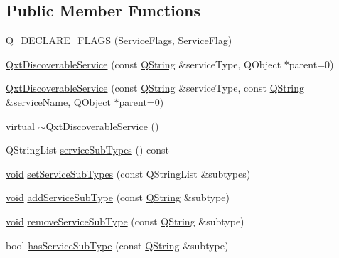 \subsection*{Public Member Functions}
\begin{DoxyCompactItemize}
\item 
\hyperlink{class_qxt_discoverable_service_aa1e5bca57c8a274e6546d1070f218bce}{Q\-\_\-\-D\-E\-C\-L\-A\-R\-E\-\_\-\-F\-L\-A\-G\-S} (Service\-Flags, \hyperlink{class_qxt_discoverable_service_ab0150c1654466841078bf25055120914}{Service\-Flag})
\item 
\hyperlink{class_qxt_discoverable_service_a46bb5631868e0e3bd4b2f62d7be0cb8d}{Qxt\-Discoverable\-Service} (const \hyperlink{group___u_a_v_objects_plugin_gab9d252f49c333c94a72f97ce3105a32d}{Q\-String} \&service\-Type, Q\-Object $\ast$parent=0)
\item 
\hyperlink{class_qxt_discoverable_service_a5ecd5ee4928d8c5530b0b89df9f8ec69}{Qxt\-Discoverable\-Service} (const \hyperlink{group___u_a_v_objects_plugin_gab9d252f49c333c94a72f97ce3105a32d}{Q\-String} \&service\-Type, const \hyperlink{group___u_a_v_objects_plugin_gab9d252f49c333c94a72f97ce3105a32d}{Q\-String} \&service\-Name, Q\-Object $\ast$parent=0)
\item 
virtual \hyperlink{class_qxt_discoverable_service_afefcc1cd57832dfd5291a3dd068250ec}{$\sim$\-Qxt\-Discoverable\-Service} ()
\item 
Q\-String\-List \hyperlink{class_qxt_discoverable_service_a4552a3a6e43a47e503240917f897ba53}{service\-Sub\-Types} () const 
\item 
\hyperlink{group___u_a_v_objects_plugin_ga444cf2ff3f0ecbe028adce838d373f5c}{void} \hyperlink{class_qxt_discoverable_service_a9f34f393ad6d0c27d56cb56e6b3f03d9}{set\-Service\-Sub\-Types} (const Q\-String\-List \&subtypes)
\item 
\hyperlink{group___u_a_v_objects_plugin_ga444cf2ff3f0ecbe028adce838d373f5c}{void} \hyperlink{class_qxt_discoverable_service_af4ad68272eff1d80dee89611233db654}{add\-Service\-Sub\-Type} (const \hyperlink{group___u_a_v_objects_plugin_gab9d252f49c333c94a72f97ce3105a32d}{Q\-String} \&subtype)
\item 
\hyperlink{group___u_a_v_objects_plugin_ga444cf2ff3f0ecbe028adce838d373f5c}{void} \hyperlink{class_qxt_discoverable_service_acc0779ea4910a6fd7455259dbcc6be1b}{remove\-Service\-Sub\-Type} (const \hyperlink{group___u_a_v_objects_plugin_gab9d252f49c333c94a72f97ce3105a32d}{Q\-String} \&subtype)
\item 
bool \hyperlink{class_qxt_discoverable_service_ab1e82564feb8ce58cae5b1d830cb93a7}{has\-Service\-Sub\-Type} (const \hyperlink{group___u_a_v_objects_plugin_gab9d252f49c333c94a72f97ce3105a32d}{Q\-String} \&subtype)

\end{DoxyCompactItemize}
